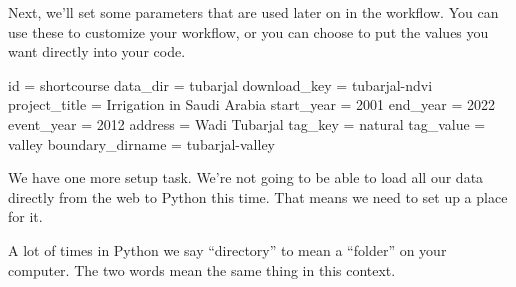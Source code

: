 \documentclass[
  letterpaper,
  DIV=11,
  numbers=noendperiod,
  oneside]{scrreprt}
\newenvironment{Shaded}{\begin{snugshade}}{\end{snugshade}}
\newcommand{\BuiltInTok}[1]{\textcolor[rgb]{0.00,0.23,0.31}{#1}}
\newcommand{\DecValTok}[1]{\textcolor[rgb]{0.68,0.00,0.00}{#1}}
\newcommand{\NormalTok}[1]{\textcolor[rgb]{0.00,0.23,0.31}{#1}}
\newcommand{\OperatorTok}[1]{\textcolor[rgb]{0.37,0.37,0.37}{#1}}
\newcommand{\StringTok}[1]{\textcolor[rgb]{0.13,0.47,0.30}{#1}}
\begin{document}
Next, we'll set some parameters that are used later on in the workflow.
You can use these to customize your workflow, or you can choose to put
the values you want directly into your code.

\begin{Shaded}
\begin{Highlighting}[]
\BuiltInTok{id} \OperatorTok{=} \StringTok{\textquotesingle{}shortcourse\textquotesingle{}}
\NormalTok{data\_dir }\OperatorTok{=} \StringTok{\textquotesingle{}tubarjal\textquotesingle{}}
\NormalTok{download\_key }\OperatorTok{=} \StringTok{\textquotesingle{}tubarjal{-}ndvi\textquotesingle{}}
\NormalTok{project\_title }\OperatorTok{=} \StringTok{\textquotesingle{}Irrigation in Saudi Arabia\textquotesingle{}}
\NormalTok{start\_year }\OperatorTok{=} \DecValTok{2001}
\NormalTok{end\_year }\OperatorTok{=} \DecValTok{2022}
\NormalTok{event\_year }\OperatorTok{=} \DecValTok{2012}
\NormalTok{address }\OperatorTok{=} \StringTok{\textquotesingle{}Wadi Tubarjal\textquotesingle{}}
\NormalTok{tag\_key }\OperatorTok{=} \StringTok{\textquotesingle{}natural\textquotesingle{}}
\NormalTok{tag\_value }\OperatorTok{=} \StringTok{\textquotesingle{}valley\textquotesingle{}}
\NormalTok{boundary\_dirname }\OperatorTok{=} \StringTok{\textquotesingle{}tubarjal{-}valley\textquotesingle{}}
\end{Highlighting}
\end{Shaded}

We have one more setup task. We're not going to be able to load all our
data directly from the web to Python this time. That means we need to
set up a place for it.

\begin{tcolorbox}[enhanced jigsaw, colbacktitle=quarto-callout-caution-color!10!white, opacityback=0, bottomtitle=1mm, toptitle=1mm, bottomrule=.15mm, left=2mm, colframe=quarto-callout-caution-color-frame, leftrule=.75mm, opacitybacktitle=0.6, colback=white, rightrule=.15mm, toprule=.15mm, breakable, titlerule=0mm, title={GOTCHA ALERT!}, coltitle=black, arc=.35mm]

A lot of times in Python we say ``directory'' to mean a ``folder'' on
your computer. The two words mean the same thing in this context.

\end{tcolorbox}
\end{document}
